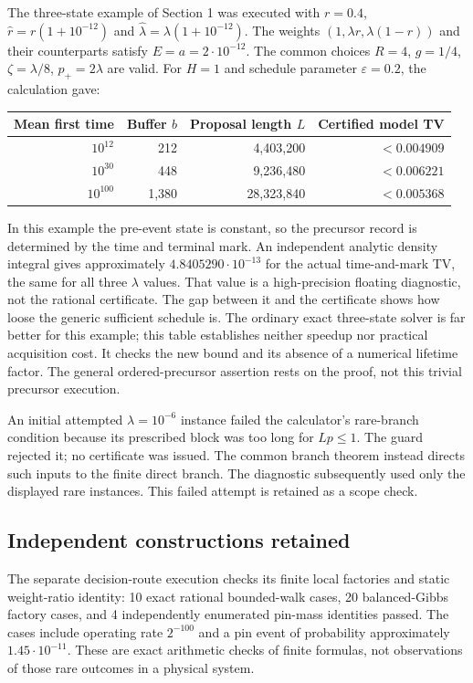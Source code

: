 The three-state example of Section 1 was executed with
$r=0.4$, $\widehat r=r(1+10^{-12})$ and
$\widehat\lambda=\lambda(1+10^{-12})$.
The weights $(1,\lambda r,\lambda(1-r))$ and their counterparts
satisfy $E=a=2\cdot10^{-12}$. The common choices
$R=4$, $g=1/4$, $\zeta=\lambda/8$, $p_+=2\lambda$ are valid.
For $H=1$ and schedule parameter $\varepsilon=0.2$, the calculation gave:

\begin{center}
\begin{tabular}{rrrr}
\toprule
Mean first time & Buffer $b$ & Proposal length $L$ & Certified model TV \\
\midrule
$10^{12}$ & 212 & 4,403,200 & $<0.004909$ \\
$10^{30}$ & 448 & 9,236,480 & $<0.006221$ \\
$10^{100}$ & 1,380 & 28,323,840 & $<0.005368$ \\
\bottomrule
\end{tabular}
\end{center}

In this example the pre-event state is constant, so the precursor record
is determined by the time and terminal mark. An independent analytic
density integral gives approximately $4.8405290\cdot10^{-13}$ for the
actual time-and-mark TV, the same for all three $\lambda$ values.
That value is a high-precision floating diagnostic, not the rational
certificate. The gap between it and the certificate shows how loose the
generic sufficient schedule is. The ordinary exact three-state solver
is far better for this example; this table establishes neither speedup
nor practical acquisition cost. It checks the new bound and its absence
of a numerical lifetime factor. The general ordered-precursor assertion
rests on the proof, not this trivial precursor execution.

An initial attempted $\lambda=10^{-6}$ instance failed the calculator's
rare-branch condition because its prescribed block was too long for
$Lp\le1$. The guard rejected it; no certificate was issued. The common
branch theorem instead directs such inputs to the finite direct branch.
The diagnostic subsequently used only the displayed rare instances.
This failed attempt is retained as a scope check.

\subsection{Independent constructions retained}
The separate decision-route execution checks its finite local factories
and static weight-ratio identity: 10 exact rational bounded-walk cases,
20 balanced-Gibbs factory cases, and 4 independently enumerated pin-mass
identities passed. The cases include operating rate $2^{-100}$ and a
pin event of probability approximately $1.45\cdot10^{-11}$. These are
exact arithmetic checks of finite formulas, not observations of those
rare outcomes in a physical system.

